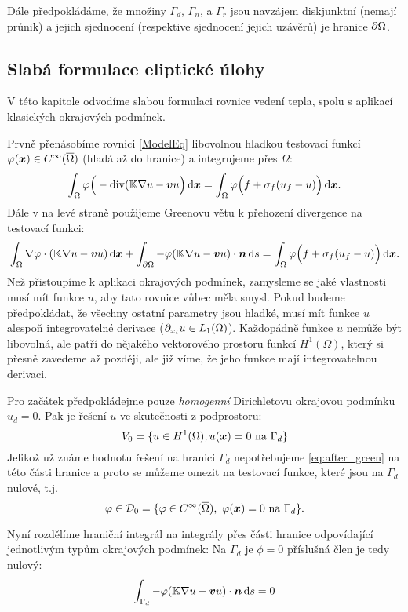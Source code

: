 Dále předpokládáme, že množiny $\Gamma_d$, $\Gamma_n$, a $\Gamma_r$ jsou navzájem diskjunktní (nemají průnik) a jejich sjednocení (respektive sjednocení jejich uzávěrů)
je hranice $\partial \Omega$.


\subsection{Slabá formulace eliptické úlohy}

V této kapitole odvodíme slabou formulaci rovnice vedení tepla, spolu s aplikací klasických okrajových podmínek.

Prvně přenásobíme rovnici \eqref{ModelEq} libovolnou hladkou testovací funkcí $\varphi(\mathbf{\boldsymbol{x}}) \in C^\infty(\overline{\Omega})$ (hladá až do hranice) a integrujeme přes $\Omega$:
\[
    \int_\Omega \varphi\Big(-{\rm div}({\mathbb{K}}\nabla u-\mathbf{\boldsymbol{v}} u\Big) \,{\rm d} \mathbf{\boldsymbol{x}} = \int_\Omega \varphi \Big(f + \sigma_f(u_f - u)\Big) \,{\rm d} \mathbf{\boldsymbol{x}}.
\]
Dále v na levé straně použijeme Greenovu větu k přehození divergence na testovací funkci:
\begin{equation}
    \label{eq:after_green}
    \int_\Omega \nabla \varphi \cdot ({\mathbb{K}}\nabla u-\mathbf{\boldsymbol{v}} u) \,{\rm d} \mathbf{\boldsymbol{x}} + \int_{\partial \Omega} -\varphi({\mathbb{K}}\nabla u-\mathbf{\boldsymbol{v}} u)\cdot \mathbf{\boldsymbol{n}} \,{\rm d} s 
    = \int_\Omega \varphi \Big(f + \sigma_f(u_f - u)\Big) \,{\rm d} \mathbf{\boldsymbol{x}}.
\end{equation}
Než přistoupíme k aplikaci okrajových podmínek, zamysleme se jaké vlastnosti musí mít funkce $u$, aby tato rovnice vůbec měla smysl. Pokud budeme předpokládat, že 
všechny ostatní parametry jsou hladké, musí mít funkce $u$ alespoň integrovatelné derivace ($\partial_{x_i} u \in L_1(\Omega)$). Každopádně funkce $u$ nemůže být libovolná, 
ale patří do nějakého vektorového prostoru funkcí $H^1(\Omega)$, který si přesně zavedeme až později, ale již víme, že jeho funkce mají integrovatelnou derivaci.

Pro začátek předpokládejme pouze \emph{homogenní} Dirichletovu okrajovou podmínku $u_d =0$. Pak je řešení $u$ ve skutečnosti z podprostoru:
\[
    V_0 = \{ u\in H^1(\Omega), u(\mathbf{\boldsymbol{x}}) = 0\text{ na } \Gamma_d \}
\]
Jelikož už známe hodnotu řešení na hranici $\Gamma_d$ nepotřebujeme \eqref{eq:after_green} na této části hranice a proto se můžeme omezit na testovací funkce, které 
jsou na $\Gamma_d$ nulové, t.j. 
\[
    \varphi \in \mathcal D_0 = \{\varphi \in C^\infty(\overline{\Omega}),\ \varphi(\mathbf{\boldsymbol{x}}) = 0\text{ na } \Gamma_d\}.
\]

Nyní rozdělíme hraniční integrál na integrály přes části hranice odpovídající jednotlivým typům okrajových podmínek:
Na $\Gamma_d$ je $\phi=0$ příslušná člen je tedy nulový:
\[
    \int_{\Gamma_d} -\varphi({\mathbb{K}}\nabla u-\mathbf{\boldsymbol{v}} u)\cdot \mathbf{\boldsymbol{n}} \,{\rm d} s = 0
\]

